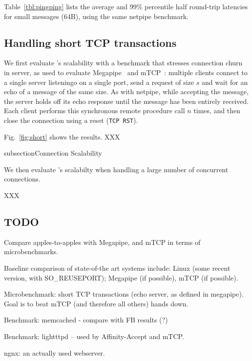 Table~\ref{tbl:pingping} lists the average and 99\% percentile half
round-trip latencies for small messages (64B), using the same netpipe
benchmark.  

\subsection{Handling short TCP transactions}



We first evaluate \ix's scalability with a benchmark that stresses
connection churn in server, as used to evaluate
Megapipe~\cite{han2012megapipe} and mTCP~\cite{jeong2014mtcp}:
multiple clients connect to a single server listeningo on a single
port, send a request of size $s$ and wait for an echo of a message of
the same size.  As with netpipe, while accepting the message, the server holds off its
echo response until the message has been entirely received.
Each client performs this synchronous remote procedure
call $n$ times, and then close the connection using a reset
(\texttt{TCP RST}).

Fig.~\ref{fig:short} shows the results. XXX


subsection{Connection Scalability}



We then evaluate \ix's scalabilty when handling a large number of concurrent connections. 

XXX


\subsection{TODO}

\todo Compare apples-to-apples with Megapipe, and mTCP in terms of microbenchmarks.

\todo Baseline comparison of state-of-the art systems include:  Linux (some recent version, with SO\_REUSEPORT); Megapipe (if possible), mTCP (if possible). 

\todo Microbenchmark: short TCP transactions (echo server, as defined in megapipe).   Goal is to beat mTCP (and therefore all others) hands down.

\todo Benchmark: memcached - compare with FB results (?)

\todo Benchmark: lightttpd -- used by Affinity-Accept and mTCP.  

\todo ngnx: an actually used webserver.

